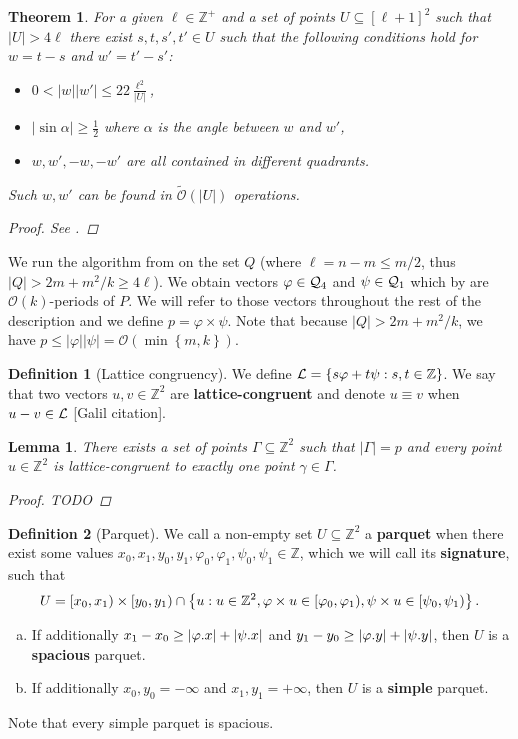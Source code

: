 \documentclass[11pt]{article}
\newcommand{\Z}{\mathbb{Z}}
\renewcommand{\O}{\mathcal{O}}
\newcommand{\tO}{\tilde{\mathcal{O}}}
\renewcommand{\phi}{\varphi}
\newcommand{\set}[1]{\left\lbrace #1 \right\rbrace}
\theoremstyle{plain}
\newtheorem{theorem}{Theorem}
\newtheorem{lemma}{Lemma}
\theoremstyle{definition}
\newtheorem{definition}{Definition}
\theoremstyle{remark}
\begin{document}
\begin{theorem} \label{get_periods}
	For a given $\ell \in \Z^+$ and a set of points $U \subseteq [\ell + 1]^2 $ such that $|U| > 4\ell$ there exist $s, t, s', t' \in U$ such that the following conditions hold for $w = t - s$ and $w' = t' - s'$:
	\begin{itemize}
		\item $0 < |w||w'| \le 22\frac{\ell^2}{|U|}$,
		\item $|\sin \alpha| \ge \frac{1}{2}$ where $\alpha$ is the angle between $w$ and $w'$,
		\item $w, w', -w, -w'$ are all contained in different quadrants.
	\end{itemize}
	Such $w, w'$ can be found in $\tO(|U|)$ operations.
	\begin{proof} See . \end{proof}
\end{theorem}


We run the algorithm from  on the set $Q$ (where $\ell = n - m \le m / 2$, thus $|Q| > 2m + m^2/k \ge 4\ell$).
We obtain vectors $\phi \in \Q_4$ and $\psi \in \mathcal{Q}_1$ which by  are $\O(k)$-periods of $P$.
We will refer to those vectors throughout the rest of the description and we define $p = \phi \times \psi$.
Note that because $|Q| > 2m + m^2 / k$, we have $p \le |\phi||\psi| = \O(\min\set{m, k})$.


\begin{definition}[Lattice congruency]\label{lattice_congruency}
	We define $\L = \set{s\phi + t\psi : s, t \in \Z}$.
	We say that two vectors $u, v \in \Z^2$ are \textbf{lattice-congruent} and denote $u \equiv v$ when $u - v \in \mathcal{L}$ [Galil citation].
\end{definition}


\begin{lemma} \label{lattice_base}
	There exists a set of points $\Gamma \subseteq \Z^2$ such that $|\Gamma| = p$ and every point $u \in \Z^2$ is lattice-congruent to exactly one point $\gamma \in \Gamma$.
	\begin{proof} TODO \end{proof}
\end{lemma}


\begin{definition}[Parquet]\label{parquet_definition}
	We call a non-empty set $U \subseteq \Z^2$ a \textbf{parquet} when there exist some values $x_0, x_1, y_0, y_1, \phi_0, \phi_1, \psi_0, \psi_1 \in \Z$, which we will call its \textbf{signature}, such that
	$$ U = [x_0, x_1) \times [y_0, y_1) \cap \set{u : u \in \Z^2, \h{u} \in [\phi_0, \phi_1), \s{u} \in [\psi_0, \psi_1)}. $$
	\begin{enumerate}[a)]
		\item If additionally $x_1 - x_0 \ge |\x{\phi}| + |\x{\psi}|$ and $y_1 - y_0 \ge |\y{\phi}| + |\y{\psi}|$, then $U$ is a \textbf{spacious} parquet.
		\item If additionally $x_0, y_0 = -\infty$ and $x_1, y_1 = +\infty$, then $U$ is a \textbf{simple} parquet.
	\end{enumerate}
	Note that every simple parquet is spacious.
\end{definition}
\end{document}
